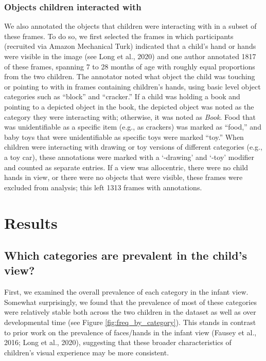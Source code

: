 \documentclass[10pt, letterpaper]{article}
\begin{document}
\hypertarget{objects-children-interacted-with}{%
\subsubsection{Objects children interacted
with}\label{objects-children-interacted-with}}

We also annotated the objects that children were interacting with in a
subset of these frames. To do so, we first selected the frames in which
participants (recruited via Amazon Mechanical Turk) indicated that a
child's hand or hands were visible in the image (see Long et al., 2020)
and one author annotated 1817 of these frames, spanning 7 to 28 months
of age with roughly equal proportions from the two children. The
annotator noted what object the child was touching or pointing to with
in frames containing children's hands, using basic level object
categories such as ``block'' and ``cracker.'' If a child was holding a
book and pointing to a depicted object in the book, the depicted object
was noted as the category they were interacting with; otherwise, it was
noted as \emph{Book}. Food that was unidentifiable as a specific item
(e.g., as crackers) was marked as ``food,'' and baby toys that were
unidentifiable as specific toys were marked ``toy.'' When children were
interacting with drawing or toy versions of different categories (e.g.,
a toy car), these annotations were marked with a `-drawing' and `-toy'
modifier and counted as separate entries. If a view was allocentric,
there were no child hands in view, or there were no objects that were
visible, these frames were excluded from analysis; this left 1313 frames
with annotations.

\hypertarget{results}{%
\section{Results}\label{results}}

\hypertarget{which-categories-are-prevalent-in-the-childs-view}{%
\subsection{Which categories are prevalent in the child's
view?}\label{which-categories-are-prevalent-in-the-childs-view}}

First, we examined the overall prevalence of each category in the infant
view. Somewhat surprisingly, we found that the prevalence of most of
these categories were relatively stable both across the two children in
the dataset as well as over developmental time (see Figure
\ref{fig:freq_by_category}). This stands in contrast to prior work on
the prevalence of faces/hands in the infant view (Fausey et al., 2016;
Long et al., 2020), suggesting that these broader characteristics of
children's visual experience may be more consistent.
\end{document}
